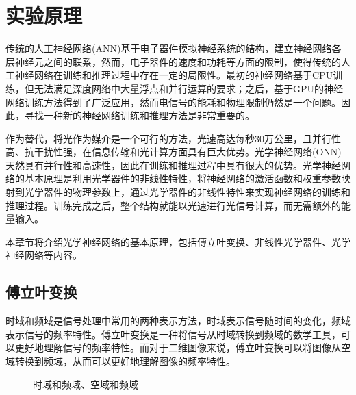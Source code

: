 \section{实验原理}

传统的人工神经网络(ANN)基于电子器件模拟神经系统的结构，建立神经网络各层神经元之间的联系，然而，电子器件的速度和功耗等方面的限制，使得传统的人工神经网络在训练和推理过程中存在一定的局限性。最初的神经网络基于CPU训练，但无法满足深度网络中大量浮点和并行运算的要求；之后，基于GPU的神经网络训练方法得到了广泛应用，然而电信号的能耗和物理限制仍然是一个问题。因此，寻找一种新的神经网络训练和推理方法是非常重要的。

作为替代，将光作为媒介是一个可行的方法，光速高达每秒30万公里，且并行性高、抗干扰性强，在信息传输和光计算方面具有巨大优势。光学神经网络(ONN)天然具有并行性和高速性，因此在训练和推理过程中具有很大的优势。光学神经网络的基本原理是利用光学器件的非线性特性，将神经网络的激活函数和权重参数映射到光学器件的物理参数上，通过光学器件的非线性特性来实现神经网络的训练和推理过程。训练完成之后，整个结构就能以光速进行光信号计算，而无需额外的能量输入。

本章节将介绍光学神经网络的基本原理，包括傅立叶变换、非线性光学器件、光学神经网络等内容。

\subsection{傅立叶变换}

时域和频域是信号处理中常用的两种表示方法，时域表示信号随时间的变化，频域表示信号的频率特性。傅立叶变换是一种将信号从时域转换到频域的数学工具，可以更好地理解信号的频率特性。而对于二维图像来说，傅立叶变换可以将图像从空域转换到频域，从而可以更好地理解图像的频率特性。

\begin{figure}[H]
    \centering
    \caption{时域和频域、空域和频域}
    \label{fig:time_domain_and_space_domain}
\end{figure}

